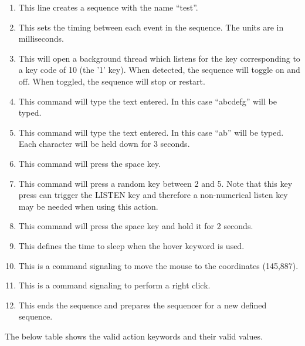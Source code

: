 \begin{enumerate}
	\item {} This line creates a sequence with the name ``test''.
	\item {} This sets the timing between each event in the sequence. The units are in milliseconds.
	\item {} This will open a background thread which listens for the key corresponding to a key code of 10 (the '1' key). When detected, the sequence will toggle on and off. When toggled, the sequence will stop or restart. 
	\item {} This command will type the text entered. In this case ``abcdefg'' will be typed.
	\item {} This command will type the text entered. In this case ``ab'' will be typed. Each character will be held down for 3 seconds.
	\item {} This command will press the space key.
	\item {} This command will press a random key between 2 and 5. Note that this key press can trigger the LISTEN key and therefore a non-numerical listen key may be needed when using this action.
	\item {} This command will press the space key and hold it for 2 seconds.
	\item {} This defines the time to sleep when the hover keyword is used.
	\item {} This is a command signaling to move the mouse to the coordinates (145,887).
	\item {} This is a command signaling to perform a right click.
	\item {} This ends the sequence and prepares the sequencer for a new defined sequence.
\end{enumerate}

The below table shows the valid action keywords and their valid values.

